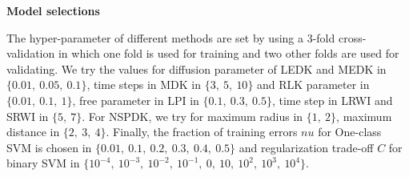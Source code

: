\documentclass{article}
\begin{document}
\textbf{Model selections}

The hyper-parameter of different methods are set by using a 3-fold cross-validation in which one fold is used for training and two other folds are used for validating.  We try the values for diffusion parameter of LEDK and MEDK in $\lbrace  0.01,\ 0.05,\ 0.1 \rbrace$, time steps in MDK in $\lbrace 3,\ 5,\ 10 \rbrace$ and RLK parameter in $\lbrace 0.01,\ 0.1,\ 1 \rbrace$, free parameter in LPI in $\lbrace 0.1,\ 0.3,\ 0.5 \rbrace$, time step in LRWI and SRWI in $\lbrace 5,\ 7 \rbrace$. For NSPDK, we try for maximum radius in $\lbrace 1,\ 2 \rbrace$, maximum distance in $\lbrace 2,\ 3,\ 4 \rbrace$. Finally, the fraction of training errors $nu$ for One-class SVM is chosen in $\lbrace 0.01,\ 0.1,\ 0.2,\ 0.3,\ 0.4,\ 0.5 \rbrace$ and regularization trade-off $C$ for binary SVM in $\lbrace 10^{-4},\ 10^{-3},\ 10^{-2},\ 10^{-1},\ 0,\ 10,\ 10^{2},\ 10^{3},\ 10^{4} \rbrace$.
\end{document}
